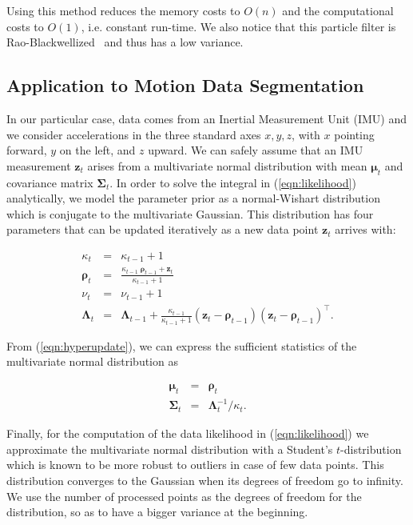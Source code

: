 Using this method reduces the memory costs to $O(n)$ and the computational costs
to $O(1)$, i.e. constant run-time. We also notice that this particle filter is
Rao-Blackwellized~\cite{casella96rao} and thus has a low variance.

\subsection{Application to Motion Data Segmentation}
In our particular case, data comes from an Inertial Measurement Unit
(IMU) and we consider accelerations in the three standard axes
$x,y,z$, with $x$ pointing forward, $y$ on the left, and $z$ upward.
We can safely assume that an IMU measurement $\mathbf{z}_t$ arises
from a multivariate normal distribution with mean $\boldsymbol{\mu}_t$
and covariance matrix $\boldsymbol{\Sigma}_t$.  In order to solve the
integral in (\ref{eqn:likelihood}) analytically, we model the
parameter prior as a normal-Wishart distribution which is conjugate to
the multivariate Gaussian.  This distribution has four parameters that
can be updated iteratively as a new data point $\mathbf{z}_t$ arrives
with:

\begin{eqnarray}
\label{eqn:hyperupdate}
\kappa_t &=& \kappa_{t-1} + 1\nonumber\\
  \boldsymbol{\rho}_t &=& \frac{\kappa_{t-1}\;\boldsymbol{\rho}_{t-1} +
\mathbf{z}_t}{\kappa_{t-1} + 1}\nonumber\\
\nu_t &=& \nu_{t-1} + 1\nonumber\\
\boldsymbol{\Lambda}_t &=& \boldsymbol{\Lambda}_{t-1} +
  \frac{\kappa_{t-1}}{\kappa_{t-1} + 1}
  (\mathbf{z}_t - \boldsymbol{\rho}_{t-1})
  (\mathbf{z}_t - \boldsymbol{\rho}_{t-1})^\intercal.
\end{eqnarray}

From (\ref{eqn:hyperupdate}), we can express the sufficient statistics of the
multivariate normal distribution as

\begin{eqnarray}
\label{eqn:ssmvn}
\boldsymbol{\mu}_t &=& \boldsymbol{\rho}_t\nonumber\\
\boldsymbol{\Sigma}_t &=& \boldsymbol{\Lambda}_t^{-1} / \kappa_t.
\end{eqnarray}

Finally, for the computation of the data likelihood in
(\ref{eqn:likelihood}) we approximate the multivariate normal
distribution with a Student's $t$-distribution which is known to be
more robust to outliers in case of few data points. This distribution
converges to the Gaussian when its degrees of freedom go to infinity.
We use the number of processed points as the degrees of freedom for
the distribution, so as to have a bigger variance at the beginning.
